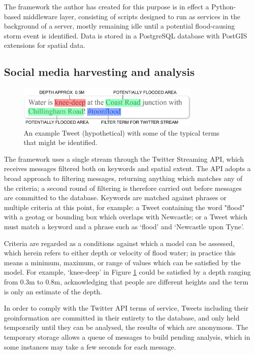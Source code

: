 The framework the author has created for this purpose is in effect a Python-based middleware layer, consisting of scripts designed to run as services in the background of a server, mostly remaining idle until a potential flood-causing storm event is identified. Data is stored in a PostgreSQL database with PostGIS extensions for spatial data.

\subsection{Social media harvesting and analysis}

\begin{figure}[pb]
	\centering
	\includegraphics[width=0.8\textwidth]{nowcasting-figures/nclsm-example-tweet.png}
	\caption{An example Tweet (hypothetical) with some of the typical terms that might be identified.}
	\label{NclSM-Example-Tweet}
\end{figure}

The framework uses a single stream through the Twitter Streaming API, which receives messages filtered both on keywords and spatial extent. The API adopts a broad approach to filtering messages, returning anything which matches any of the criteria; a second round of filtering is therefore carried out before messages are committed to the database. Keywords are matched against phrases or multiple criteria at this point, for example: a Tweet containing the word "flood" with a geotag or bounding box which overlaps with Newcastle; or a Tweet which must match a keyword and a phrase such as ‘flood’ and ‘Newcastle upon Tyne’. 

Criteria are regarded as a conditions against which a model can be assessed, which herein refers to either depth or velocity of flood water; in practice this means a minimum, maximum, or range of values which can be satisfied by the model. For example, `knee-deep' in Figure \ref{NclSM-Example-Tweet} could be satisfied by a depth ranging from 0.3m to 0.8m, acknowledging that people are different heights and the term is only an estimate of the depth. 

In order to comply with the Twitter API terms of service, Tweets including their geoinformation are committed in their entirety to the database, and only held temporarily until they can be analysed, the results of which are anonymous. The temporary storage allows a queue of messages to build pending analysis, which in some instances may take a few seconds for each message.

